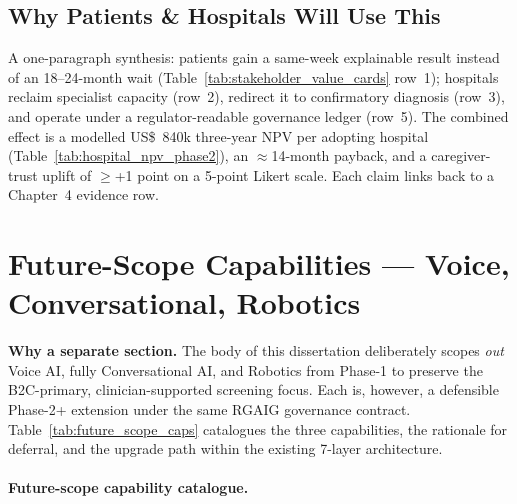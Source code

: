 \subsection{Why Patients \& Hospitals Will Use This}
\label{subsec:why_use}

\noindent A one-paragraph synthesis: patients gain a same-week
explainable result instead of an 18--24-month wait
(Table~\ref{tab:stakeholder_value_cards} row~1); hospitals reclaim
specialist capacity (row~2), redirect it to confirmatory diagnosis
(row~3), and operate under a regulator-readable governance ledger
(row~5). The combined effect is a modelled US\$~840k three-year NPV per
adopting hospital (Table~\ref{tab:hospital_npv_phase2}), an
$\approx$14-month payback, and a caregiver-trust uplift of $\ge$+1
point on a 5-point Likert scale. Each claim links back to a Chapter~4
evidence row.

\section{Future-Scope Capabilities --- Voice, Conversational, Robotics}
\label{sec:future_scope_capabilities}

\noindent\textbf{Why a separate section.} The body of this dissertation
deliberately scopes \emph{out} Voice AI, fully Conversational AI, and
Robotics from Phase-1 to preserve the B2C-primary, clinician-supported
screening focus. Each is, however, a defensible Phase-2+ extension under
the same RGAIG governance contract. Table~\ref{tab:future_scope_caps}
catalogues the three capabilities, the rationale for deferral, and the
upgrade path within the existing 7-layer architecture.

\paragraph{Future-scope capability catalogue.}

